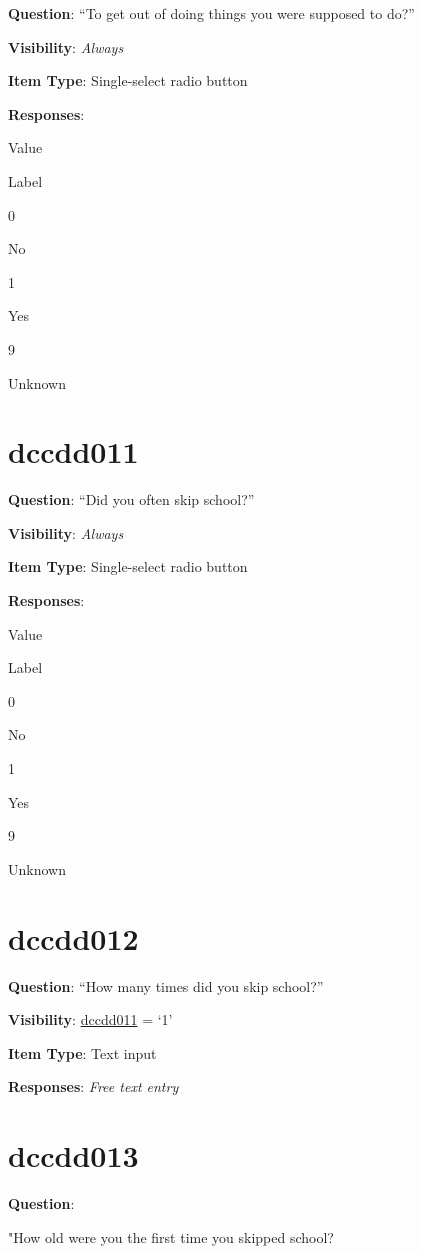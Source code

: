 \documentclass[]{book}
\begin{document}
\textbf{Question}: ``To get out of doing things you were supposed to do?''

\textbf{Visibility}: \emph{Always}

\textbf{Item Type}: Single-select radio button

\textbf{Responses}:

Value

Label

0

No

1

Yes

9

Unknown

\hypertarget{dccdd011}{%
\section{dccdd011}\label{dccdd011}}

\textbf{Question}: ``Did you often skip school?''

\textbf{Visibility}: \emph{Always}

\textbf{Item Type}: Single-select radio button

\textbf{Responses}:

Value

Label

0

No

1

Yes

9

Unknown

\hypertarget{dccdd012}{%
\section{dccdd012}\label{dccdd012}}

\textbf{Question}: ``How many times did you skip school?''

\textbf{Visibility}: \protect\hyperlink{dccdd011}{dccdd011} = `1'

\textbf{Item Type}: Text input

\textbf{Responses}: \emph{Free text entry}

\hypertarget{dccdd013}{%
\section{dccdd013}\label{dccdd013}}

\textbf{Question}:

"How old were you the first time you skipped school?
\end{document}
